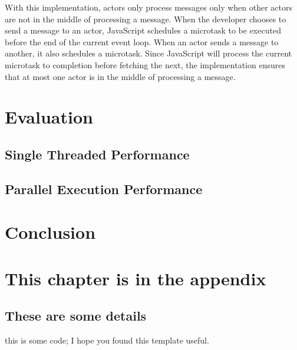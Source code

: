 \documentclass[12pt, a4paper]{report}
\newenvironment{code}
{\footnotesize\verbatim}{\endverbatim\normalfont}
\theoremstyle{definition}
\theoremstyle{definition}%
\theoremstyle{definition}%
\theoremstyle{definition}%
\theoremstyle{definition}%
\theoremstyle{definition}%
\begin{document}
With this implementation, actors only process messages only when other actors are not in the middle of processing a message. When the developer chooses to send a message to an actor, JavaScript schedules a microtask to be executed before the end of the current event loop. When an actor sends a message to another, it also schedules a microtask. Since JavaScript will process the current microtask to completion before fetching the next, the implementation ensures that at most one actor is in the middle of processing a message.
\chapter{Evaluation}
\section{Single Threaded Performance}
\section{Parallel Execution Performance}
\chapter{Conclusion}

\appendix

\chapter{This chapter is in the appendix}
\section{These are some details}
\begin{code}
this is some code;
I hope you found this template useful.
\end{code}


\bibliomatter





 
\end{document}

